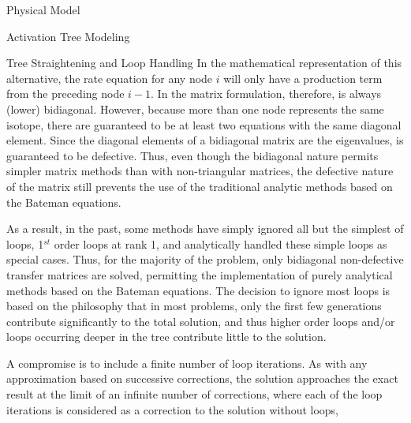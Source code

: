 \begin{chapter}{Physical Model\label{chap:physical}}
\begin{section}{Activation Tree Modeling\label{sec:physical.chains}}
\begin{subsection}{Tree Straightening and Loop Handling}
    In the mathematical representation of this alternative, the rate
    equation for any node $i$ will only have a production term from
    the preceding node $i-1$.  In the matrix formulation, therefore,
     is always (lower) bidiagonal.  However, because more than
    one node represents the same isotope, there are guaranteed to be
    at least two equations with the same diagonal element.  Since the
    diagonal elements of a bidiagonal matrix are the eigenvalues,
     is guaranteed to be defective.  Thus, even though the
    bidiagonal nature permits simpler matrix methods than with
    non-triangular matrices, the defective nature of the matrix still
    prevents the use of the traditional analytic methods based on the
    Bateman equations.
    
    As a result, in the past, some methods have simply ignored all but
    the simplest of loops, 1$^{st}$ order loops at rank 1, and
    analytically handled these simple loops as special cases.  Thus,
    for the majority of the problem, only bidiagonal non-defective
    transfer matrices are solved, permitting the implementation of
    purely analytical methods based on the Bateman equations.  The
    decision to ignore most loops is based on the philosophy that in
    most problems, only the first few generations contribute
    significantly to the total solution, and thus higher order loops
    and/or loops occurring deeper in the tree contribute little to the
    solution.
    
    A compromise is to include a finite number of loop iterations.  As
    with any approximation based on successive corrections, the
    solution approaches the exact result at the limit of an infinite
    number of corrections, where each of the loop iterations is
    considered as a correction to the solution without loops,
    

\end{subsection}
\end{section}
\end{chapter}
